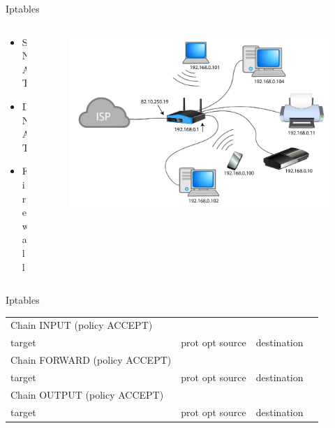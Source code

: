 \documentclass[aspectratio=169,10pt,t]{beamer}
\begin{document}
\begin{frame}[t]{Iptables}
\begin{columns}
	\begin{column}{0.2\textwidth}
	\begin{itemize}
		\item SNAT
		\item DNAT
		\item Firewall
	\end{itemize}
		
	\end{column}
	\begin{column}{0.8\textwidth}
	\vspace{-1.1cm}
	\begin{figure}[h]
		\centering
		\includegraphics[width=1\linewidth]{Img/NAT.png}
	\end{figure}
		
	\end{column}
	
\end{columns}



\end{frame}

\begin{frame}[t]{Iptables}

	\begin{tabular}{*{4}{l}}
		Chain INPUT (policy ACCEPT)&&&\\
		target&prot opt source&destination&\\

		Chain FORWARD (policy ACCEPT)\\
		target&prot opt source&destination&\\

		Chain OUTPUT (policy ACCEPT)\\
		target&prot opt source&destination&\\
	\end{tabular}
	
\end{frame}
\end{document}
